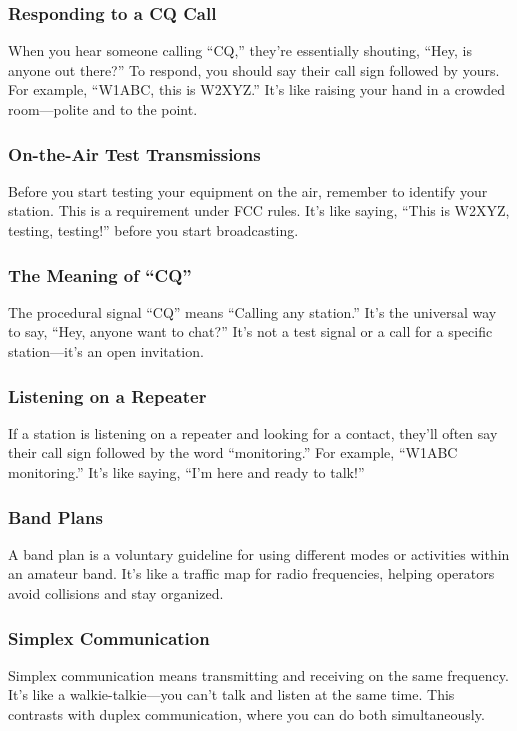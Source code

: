 \subsubsection*{Responding to a CQ Call}
When you hear someone calling “CQ,” they’re essentially shouting, “Hey, is anyone out there?” To respond, you should say their call sign followed by yours. For example, “W1ABC, this is W2XYZ.” It’s like raising your hand in a crowded room—polite and to the point.

\subsubsection*{On-the-Air Test Transmissions}
Before you start testing your equipment on the air, remember to identify your station. This is a requirement under FCC rules. It’s like saying, “This is W2XYZ, testing, testing!” before you start broadcasting.

\subsubsection*{The Meaning of “CQ”}
The procedural signal “CQ” means “Calling any station.” It’s the universal way to say, “Hey, anyone want to chat?” It’s not a test signal or a call for a specific station—it’s an open invitation.

\subsubsection*{Listening on a Repeater}
If a station is listening on a repeater and looking for a contact, they’ll often say their call sign followed by the word “monitoring.” For example, “W1ABC monitoring.” It’s like saying, “I’m here and ready to talk!”

\subsubsection*{Band Plans}
A band plan is a voluntary guideline for using different modes or activities within an amateur band. It’s like a traffic map for radio frequencies, helping operators avoid collisions and stay organized.

\subsubsection*{Simplex Communication}
Simplex communication means transmitting and receiving on the same frequency. It’s like a walkie-talkie—you can’t talk and listen at the same time. This contrasts with duplex communication, where you can do both simultaneously.

